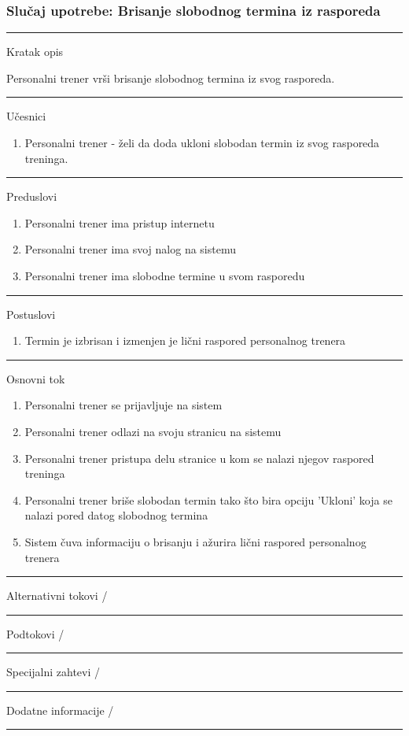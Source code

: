 \subsubsection{Slučaj upotrebe: Brisanje slobodnog termina iz rasporeda}

\begin{center}
\vspace{0.2cm}
\hrule
\vspace{0.2cm}
    \begin{center}
    Kratak opis  
    \end{center}
    Personalni trener vrši brisanje slobodnog termina iz svog rasporeda. 
    \vspace{0.2cm}\\ 
\hrule
\vspace{0.2cm}
    Učesnici
    \begin{enumerate}
    \item  Personalni trener - želi da doda ukloni slobodan termin iz svog rasporeda treninga. 
    \end{enumerate}
\hrule
\vspace{0.2cm}
   Preduslovi 
    \begin{enumerate}
    \item Personalni trener ima pristup internetu
    \item Personalni trener ima svoj nalog na sistemu
    \item Personalni trener ima slobodne termine u svom rasporedu
    \end{enumerate} 
\hrule
\vspace{0.2cm}  
    Postuslovi
    \begin{enumerate}
    \item Termin je izbrisan i izmenjen je lični raspored personalnog trenera
    \end{enumerate}
\hrule
\vspace{0.2cm}
    Osnovni tok
    \begin{enumerate}
    \item Personalni trener se prijavljuje na sistem
    \item Personalni trener odlazi na svoju stranicu na sistemu
    \item Personalni trener pristupa delu stranice u kom se nalazi njegov raspored treninga
    \item Personalni trener briše slobodan termin tako što bira opciju 'Ukloni' koja se nalazi pored datog slobodnog termina
    \item Sistem čuva informaciju o brisanju i ažurira lični raspored personalnog trenera
    \end{enumerate}
\hrule
\vspace{0.2cm}
    Alternativni tokovi  /\\
\hrule
\vspace{0.2cm}
    Podtokovi  /\\
\hrule
\vspace{0.2cm}
    Specijalni zahtevi  /\\
\hrule
\vspace{0.2cm}
    Dodatne informacije  /\\
\hrule
\vspace{0.5cm}
\end{center}


